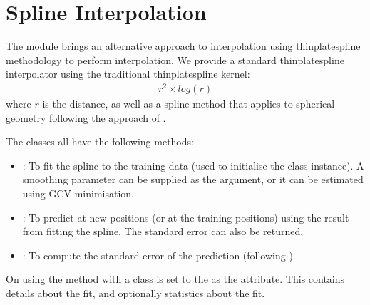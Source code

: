 \documentclass[letterpaper,10pt,english]{sphinxmanual}
\begin{document}
\sphinxstepscope


\chapter{Spline Interpolation}
\label{\detokenize{splines:spline-interpolation}}\label{\detokenize{splines::doc}}
\sphinxAtStartPar
The  module brings an alternative approach to interpolation using thin\sphinxhyphen{}plate\sphinxhyphen{}spline
methodology to perform interpolation. We provide a standard thin\sphinxhyphen{}plate\sphinxhyphen{}spline interpolator using
the traditional thin\sphinxhyphen{}plate\sphinxhyphen{}spline kernel:
\begin{equation*}
\begin{split}r^2 \times log(r)\end{split}
\end{equation*}
\sphinxAtStartPar
where \(r\) is the distance, as well as a spline method that applies to spherical geometry
following the approach of .

\sphinxAtStartPar
The  classes all have the following methods:
\begin{itemize}
\item {}
\sphinxAtStartPar
{} : To fit the spline to the training data (used to initialise the class instance). A
smoothing parameter can be supplied as the  argument, or it can be estimated using GCV
minimisation.

\item {}
\sphinxAtStartPar
{} : To predict at new positions (or at the training positions) using the result from
fitting the spline. The standard error can also be returned.

\item {}
\sphinxAtStartPar
{} : To compute the standard error of the prediction (following ).

\end{itemize}

\sphinxAtStartPar
On using the  method with  a  class is set to the  as
the  attribute. This contains details about the fit, and optionally statistics about the
fit.
\end{document}
